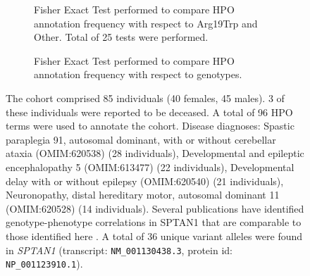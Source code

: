\begin{figure}[htbp]
\begin{subfigure}[b]{0.95\textwidth}
{}
\captionsetup{justification=raggedright,singlelinecheck=false}
\caption{Fisher Exact Test performed to compare HPO annotation frequency with respect to Arg19Trp and Other. Total of
        25 tests were performed. }
\end{subfigure}
\vspace{2em}
\begin{subfigure}[b]{0.95\textwidth}
\centering
{}
\captionsetup{justification=raggedright,singlelinecheck=false}
\caption{Fisher Exact Test performed to compare HPO annotation frequency with respect to genotypes. }
\end{subfigure}

\vspace{2em}

\caption{ The cohort comprised 85 individuals (40 females, 45 males). 3 of these individuals were reported to be deceased. A total of 96 HPO terms were used to annotate the cohort. Disease diagnoses: Spastic paraplegia 91, autosomal dominant, with or without cerebellar ataxia (OMIM:620538) (28 individuals), Developmental and epileptic encephalopathy 5 (OMIM:613477) (22 individuals), Developmental delay with or without epilepsy (OMIM:620540) (21 individuals), Neuronopathy, distal hereditary motor, autosomal dominant 11 (OMIM:620528) (14 individuals). Several publications have identified genotype-phenotype correlations in SPTAN1 that are comparable to those
identified here \cite{PMID_25631096,PMID_36331550,PMID_35150594}.
 A total of 36 unique variant alleles were found in \textit{SPTAN1} (transcript: \texttt{NM\_001130438.3}, protein id: \texttt{NP\_001123910.1}).}
\end{figure}
